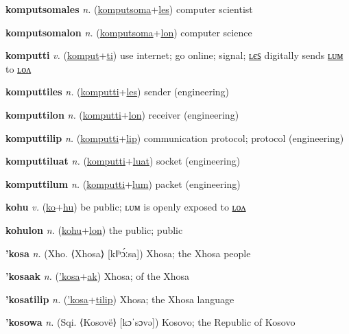 \textbf{\hypertarget{komputsomales}{komputsomales}} \textit{n.} (\hyperlink{komputsoma}{komputsoma}+\allowbreak \hyperlink{les}{les})
computer scientist

\textbf{\hypertarget{komputsomalon}{komputsomalon}} \textit{n.} (\hyperlink{komputsoma}{komputsoma}+\allowbreak \hyperlink{lon}{lon})
computer science

\textbf{\hypertarget{komputti}{komputti}} \textit{v.} (\hyperlink{komput}{komput}+\allowbreak \hyperlink{ti}{ti})
use internet; go online; signal; \hyperlink{komputtiles}{ʟєꜱ} digitally sends \hyperlink{komputtilum}{ʟᴜᴍ} to \hyperlink{komputtilon}{ʟᴏᴧ}

\textbf{\hypertarget{komputtiles}{komputtiles}} \textit{n.} (\hyperlink{komputti}{komputti}+\allowbreak \hyperlink{les}{les})
sender (engineering)

\textbf{\hypertarget{komputtilon}{komputtilon}} \textit{n.} (\hyperlink{komputti}{komputti}+\allowbreak \hyperlink{lon}{lon})
receiver (engineering)

\textbf{\hypertarget{komputtilip}{komputtilip}} \textit{n.} (\hyperlink{komputti}{komputti}+\allowbreak \hyperlink{lip}{lip})
communication protocol; protocol (engineering)

\textbf{\hypertarget{komputtiluat}{komputtiluat}} \textit{n.} (\hyperlink{komputti}{komputti}+\allowbreak \hyperlink{luat}{luat})
socket (engineering)

\textbf{\hypertarget{komputtilum}{komputtilum}} \textit{n.} (\hyperlink{komputti}{komputti}+\allowbreak \hyperlink{lum}{lum})
packet (engineering)

\textbf{\hypertarget{kohu}{kohu}} \textit{v.} (\hyperlink{ko}{ko}+\allowbreak \hyperlink{hu}{hu})
be public; ʟᴜᴍ is openly exposed to \hyperlink{kohulon}{ʟᴏᴧ}

\textbf{\hypertarget{kohulon}{kohulon}} \textit{n.} (\hyperlink{kohu}{kohu}+\allowbreak \hyperlink{lon}{lon})
the public; public

\textbf{\hypertarget{'kosa}{'kosa}} \textit{n.} (Xho. ⟨Xhosa⟩ [kǁʰɔ́ːsa])
Xhosa; the Xhosa people

\textbf{\hypertarget{'kosaak}{'kosaak}} \textit{n.} (\hyperlink{'kosa}{'kosa}+\allowbreak \hyperlink{ak}{ak})
Xhosa; of the Xhosa

\textbf{\hypertarget{'kosatilip}{'kosatilip}} \textit{n.} (\hyperlink{'kosa}{'kosa}+\allowbreak \hyperlink{tilip}{tilip})
Xhosa; the Xhosa language

\textbf{\hypertarget{'kosowa}{'kosowa}} \textit{n.} (Sqi. ⟨Kosovë⟩ [kɔˈsɔvə])
Kosovo; the Republic of Kosovo

